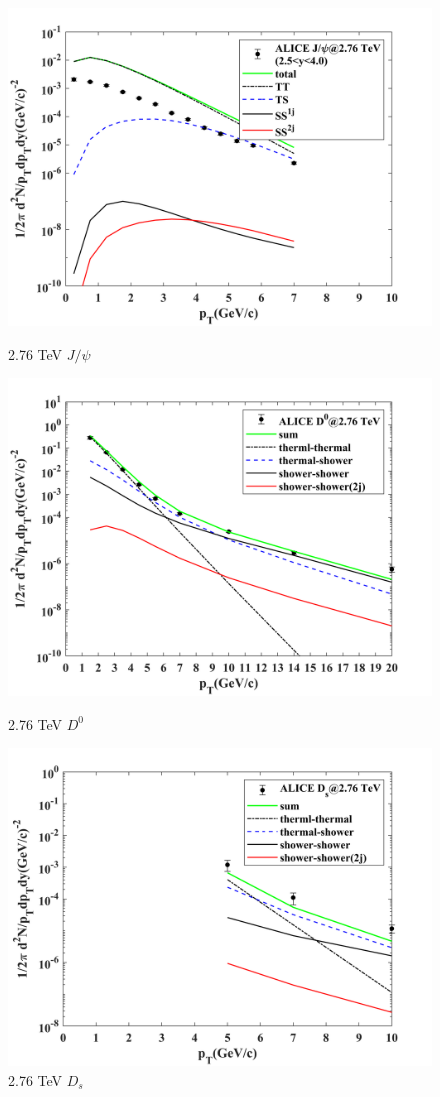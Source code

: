 \documentclass[onecolumn,aps,superscriptaddress,nofootinbib,floatfix]{revtex4}
\begin{document}
\begin{figure}[H]
	\centering
	\begin{minipage}{0.3\linewidth}
		\centering
		\includegraphics[width=0.9\linewidth]{230704_Jpsi_276.png}
		\caption{2.76 TeV $J/\psi$}
	\end{minipage}
    \begin{minipage}{0.3\linewidth}
    	\centering
    	\includegraphics[width=0.9\linewidth]{230704_D0_276.png}
    	\caption{2.76 TeV $D^0$}
    \end{minipage}
	\begin{minipage}{0.3\linewidth}
		\centering
		\includegraphics[width=0.9\linewidth]{230704_Ds_276.png}
		\caption{2.76 TeV $D_s$}
	\end{minipage}
	

\end{figure}
\end{document}
